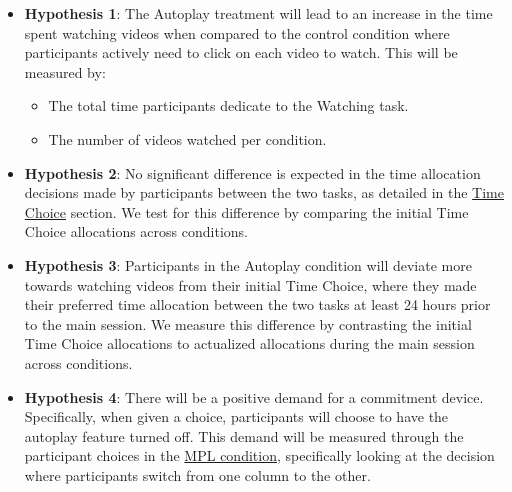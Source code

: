 \documentclass[11pt,a4paper,oneside]{article}
\begin{document}
\begin{itemize}
    \item \textbf{Hypothesis 1}: The Autoplay treatment will lead to an increase in the time spent watching videos when compared to the control condition where participants actively need to click on each video to watch. This will be measured by:
    \begin{itemize}
        \item[\textbf{1.1}] The total time participants dedicate to the Watching task.
        \item[\textbf{1.2}] The number of videos watched per condition.
    \end{itemize} 

    \item \textbf{Hypothesis 2}: No significant difference is expected in the time allocation decisions made by participants between the two tasks, as detailed in the \hyperref[time-choice]{Time Choice} section. We test for this difference by comparing the initial Time Choice allocations across conditions.
    
    \item \textbf{Hypothesis 3}: Participants in the Autoplay condition will deviate more towards watching videos from their initial Time Choice, where they made their preferred time allocation between the two tasks at least 24 hours prior to the main session. We measure this difference by contrasting the initial Time Choice allocations to actualized allocations during the main session across conditions. 
    
    \item \textbf{Hypothesis 4}: There will be a positive demand for a commitment device. Specifically, when given a choice, participants will choose to have the autoplay feature turned off. This demand will be measured through the participant choices in the \hyperref[mpl]{MPL condition}, specifically looking at the decision where participants switch from one column to the other.
    
    


    
\end{itemize}
\end{document}
